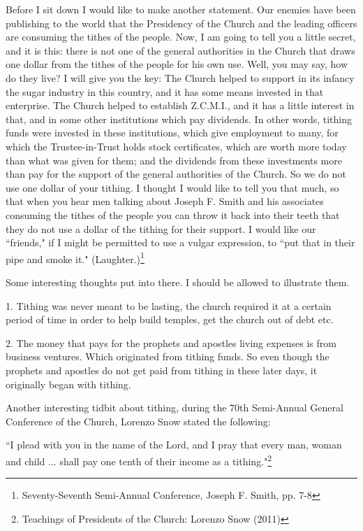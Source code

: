 \begin{displayquote}
Before I sit down I would like to make another statement. Our enemies have been
publishing to the world that the Presidency of the Church and the leading officers
are consuming the tithes of the people. Now, I am going to tell you a little secret,
and it is this: there is not one of the general authorities in the Church that draws
one dollar from the tithes of the people for his own use. Well, you may say, how do
they live? I will give you the key: The Church helped to support in its infancy the
sugar industry in this country, and it has some means invested in that enterprise.
The Church helped to establish Z.C.M.I., and it has a little interest in that, and
in some other institutions which pay dividends. In other words, tithing funds were
invested in these institutions, which give employment to many, for which the
Trustee-in-Trust holds stock certificates, which are worth more today than what was
given for them; and the dividends from these investments more than pay for the
support of the general authorities of the Church. So we do not use one dollar of your
tithing. I thought I would like to tell you that much, so that when you hear men
talking about Joseph F. Smith and his associates consuming the tithes of the people
you can throw it back into their teeth that they do not use a dollar of the tithing
for their support. I would like our ``friends," if I might be permitted to use a
vulgar expression, to ``put that in their pipe and smoke it."
(Laughter.)\footnote{Seventy-Seventh Semi-Annual Conference, Joseph F. Smith, pp. 7-8}
\end{displayquote}

Some interesting thoughts put into there. I should be allowed to illustrate them.

1. Tithing was never meant to be lasting, the church required it at a certain period
of time in order to help build temples, get the church out of debt etc.

2. The money that pays for the prophets and apostles living expenses is from business
ventures. Which originated from tithing funds. So even though the prophets and
apostles do not get paid from tithing in these later days, it originally began with
tithing.

Another interesting tidbit about tithing, during the 70th Semi-Annual General
Conference of the Church, Lorenzo Snow stated the following:

\begin{displayquote}
``I plead with you in the name of the Lord, and I pray that every man, woman and 
child ... shall pay one tenth of their income as a tithing."\footnote{
Teachings of Presidents of the Church: Lorenzo Snow (2011)
}
\end{displayquote}

